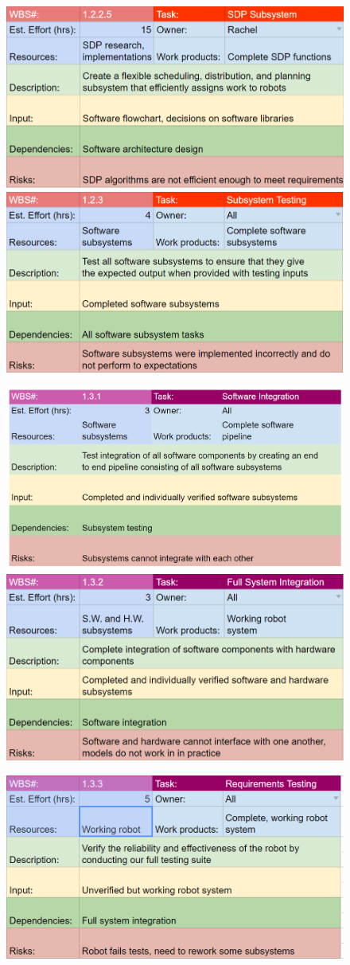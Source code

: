 \begin{figure}[h!]
\centering
\includegraphics[width=0.49\columnwidth]{wbs_schedule/wbs_dict_sw6.PNG}
\includegraphics[width=0.49\columnwidth]{wbs_schedule/wbs_dict_sw7.PNG}
\label{fig:sw6sw7}
\end{figure}
\begin{figure}[h!]
\centering
\includegraphics[width=0.49\columnwidth]{wbs_schedule/wbs_dict_int1.PNG}
\includegraphics[width=0.49\columnwidth]{wbs_schedule/wbs_dict_int2.PNG}
\label{fig:int1int2}
\end{figure}
\begin{figure}[h!]
\centering
\includegraphics[width=0.49\columnwidth]{wbs_schedule/wbs_dict_int3.PNG}
\label{fig:int3}
\end{figure}

